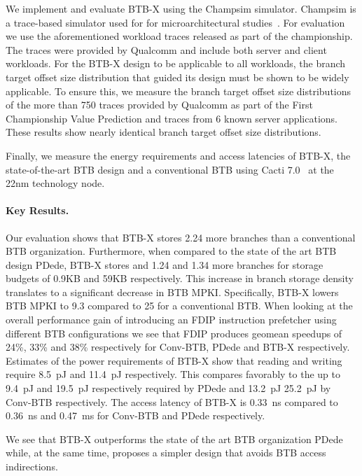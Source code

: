 \documentclass[../main.tex]{subfiles}
\begin{document}
\begin{refsection}
We implement and evaluate BTB-X using the Champsim simulator. Champsim
is a trace-based simulator used for for microarchitectural
studies~\cite{champsim}. For evaluation we use the aforementioned
workload traces released as part of the  championship. The traces
were provided by Qualcomm and include both server and client
workloads. For the BTB-X design to be applicable to all workloads, the
branch target offset size distribution that guided its design must be
shown to be widely applicable. To ensure this, we measure the branch
target offset size distributions of the more than 750 traces provided
by Qualcomm as part of the First Championship Value Prediction 
and traces from 6 known server applications. These results show nearly
identical branch target offset size distributions.

Finally, we measure the energy requirements and access latencies of
BTB-X, the state-of-the-art BTB design and a conventional BTB using Cacti 7.0~\cite{cacti} at the 22nm technology node.

\paragraph{Key Results.}

Our evaluation shows that BTB-X stores 2.24\texttimes{} more branches
than a conventional BTB organization. Furthermore, when compared to
the state of the art BTB design PDede, BTB-X stores  and
1.24\texttimes{} and 1.34\texttimes{} more branches for storage budgets of
0.9KB and 59KB respectively. This increase in branch storage density
translates to a significant decrease in BTB MPKI. Specifically, BTB-X lowers BTB MPKI to 9.3 compared to 25 for a conventional BTB. When looking at the overall performance gain of introducing an FDIP instruction prefetcher using different BTB configurations we see that FDIP produces geomean speedups of 24\%, 33\% and 38\% respectively for Conv-BTB, PDede and BTB-X respectively. Estimates of the power requirements of BTB-X show that reading and writing require 8.5~pJ and 11.4~pJ respectively. This compares favorably to the up to 9.4~pJ and 19.5~pJ respectively required by PDede and 13.2~pJ 25.2~pJ by Conv-BTB respectively. The access latency of BTB-X is 0.33~ns compared to 0.36~ns and 0.47~ms for Conv-BTB and PDede respectively.

We see that BTB-X outperforms the state of the art BTB organization PDede while, at the same time, proposes a simpler design that avoids BTB access indirections.



\end{refsection}
\end{document}
